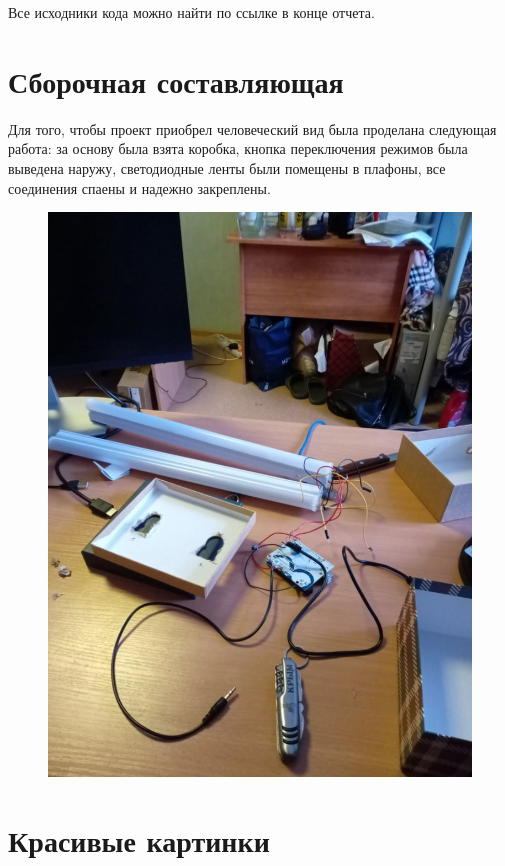 \documentclass[a4paper, 12pt]{article}%
\begin{document}
Все исходники кода можно найти по ссылке в конце отчета.

\section{Сборочная составляющая}

Для того, чтобы проект приобрел человеческий вид была проделана следующая работа: за основу была взята коробка, кнопка переключения режимов была выведена наружу, светодиодные ленты были помещены в плафоны, все соединения спаены и надежно закреплены.

\newpage

\begin{figure}[!h]
\begin{center}
\includegraphics[scale=0.4]{pictures/work1.png}
\end{center}
\end{figure}

\section{Красивые картинки}
\end{document}
